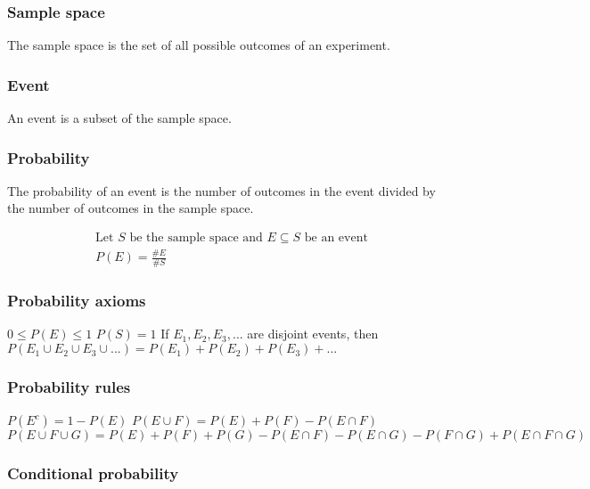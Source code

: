 \documentclass{article}
\begin{document}
\subsubsection{Sample space}

The sample space is the set of all possible outcomes of an experiment.

\subsubsection{Event}

An event is a subset of the sample space.

\subsubsection{Probability}

The probability of an event is the number of outcomes in the event divided by the number of outcomes in the sample space.

\begin{align*}
    \text{Let } S \text{ be the sample space and } E \subseteq S \text{ be an event} \\
    P(E) = \frac{\#E}{\#S}
\end{align*}

\subsubsection{Probability axioms}

\begin{outline}
    \1 $0 \leq P(E) \leq 1$
    \1 $P(S) = 1$
    \1 If $E_1, E_2, E_3, ...$ are disjoint events, then $P(E_1 \cup E_2 \cup E_3 \cup ...) = P(E_1) + P(E_2) + P(E_3) + ...$
\end{outline}

\subsubsection{Probability rules}

\begin{outline}
    \1 $P(E^c) = 1 - P(E)$
    \1 $P(E \cup F) = P(E) + P(F) - P(E \cap F)$
    \1 $P(E \cup F \cup G) = P(E) + P(F) + P(G) - P(E \cap F) - P(E \cap G) - P(F \cap G) + P(E \cap F \cap G)$
\end{outline}

\subsubsection{Conditional probability}
\end{document}
